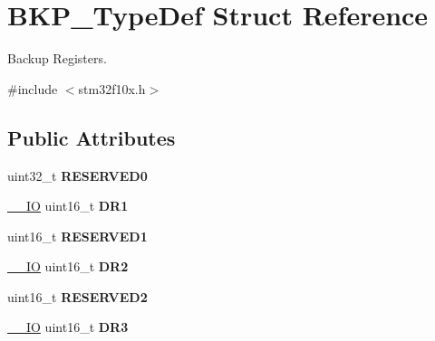 \hypertarget{struct_b_k_p___type_def}{\section{B\-K\-P\-\_\-\-Type\-Def Struct Reference}
\label{struct_b_k_p___type_def}
}


Backup Registers.  




{\ttfamily \#include $<$stm32f10x.\-h$>$}

\subsection*{Public Attributes}
\begin{DoxyCompactItemize}
\item 
\hypertarget{struct_b_k_p___type_def_a8b41b52d05011ff2ed2b85977ea20413}{uint32\-\_\-t {\bfseries R\-E\-S\-E\-R\-V\-E\-D0}}\label{struct_b_k_p___type_def_a8b41b52d05011ff2ed2b85977ea20413}

\item 
\hypertarget{struct_b_k_p___type_def_aaa1a907c0aaf85c6de3aa3d829a07a3a}{\hyperlink{group___c_m_s_i_s__core__definitions_gaec43007d9998a0a0e01faede4133d6be}{\-\_\-\-\_\-\-I\-O} uint16\-\_\-t {\bfseries D\-R1}}\label{struct_b_k_p___type_def_aaa1a907c0aaf85c6de3aa3d829a07a3a}

\item 
\hypertarget{struct_b_k_p___type_def_a0d818c25d71abdfc33e9d3d905a0f5f2}{uint16\-\_\-t {\bfseries R\-E\-S\-E\-R\-V\-E\-D1}}\label{struct_b_k_p___type_def_a0d818c25d71abdfc33e9d3d905a0f5f2}

\item 
\hypertarget{struct_b_k_p___type_def_a98d088136a3ba92025a8381d9a19f7b0}{\hyperlink{group___c_m_s_i_s__core__definitions_gaec43007d9998a0a0e01faede4133d6be}{\-\_\-\-\_\-\-I\-O} uint16\-\_\-t {\bfseries D\-R2}}\label{struct_b_k_p___type_def_a98d088136a3ba92025a8381d9a19f7b0}

\item 
\hypertarget{struct_b_k_p___type_def_ae9cc232260bb14cfbdb0ecee85b2be50}{uint16\-\_\-t {\bfseries R\-E\-S\-E\-R\-V\-E\-D2}}\label{struct_b_k_p___type_def_ae9cc232260bb14cfbdb0ecee85b2be50}

\item 
\hypertarget{struct_b_k_p___type_def_a034cf532a9752513de879c0f4ff38d0a}{\hyperlink{group___c_m_s_i_s__core__definitions_gaec43007d9998a0a0e01faede4133d6be}{\-\_\-\-\_\-\-I\-O} uint16\-\_\-t {\bfseries D\-R3}}\label{struct_b_k_p___type_def_a034cf532a9752513de879c0f4ff38d0a}


\end{DoxyCompactItemize}
